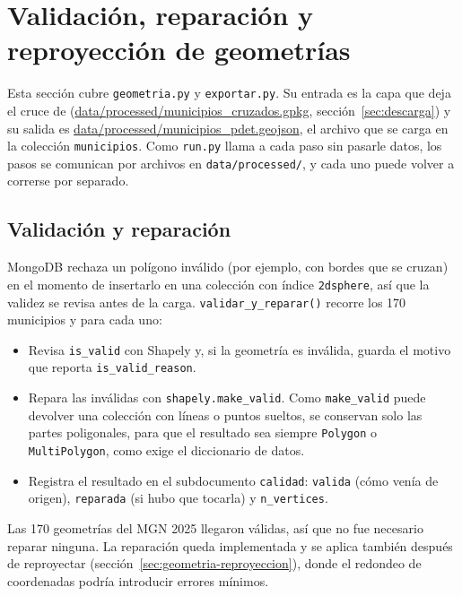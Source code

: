 \documentclass[11pt,a4paper]{article}
\newcommand{\campo}[1]{\texttt{#1}}
\newcommand{\ruta}[1]{\begingroup\urlstyle{tt}\url{#1}\endgroup}
\begin{document}
\section{Validación, reparación y reproyección de geometrías}
\label{sec:geometria}

Esta sección cubre \campo{geometria.py} y \campo{exportar.py}. Su entrada es
la capa que deja el cruce de (\ruta{data/processed/municipios_cruzados.gpkg},
sección~\ref{sec:descarga}) y su salida es
\ruta{data/processed/municipios_pdet.geojson}, el archivo que se carga en
la colección \campo{municipios}. Como \campo{run.py} llama a cada paso sin
pasarle datos, los pasos se comunican por archivos en
\campo{data/processed/}, y cada uno puede volver a correrse por separado.

\subsection{Validación y reparación}
\label{sec:geometria-validacion}

MongoDB rechaza un polígono inválido (por ejemplo, con bordes que se
cruzan) en el momento de insertarlo en una colección con índice
\campo{2dsphere}, así que la validez se revisa antes de la carga.
\campo{validar\_y\_reparar()} recorre los 170 municipios y para cada uno:

\begin{itemize}
  \item Revisa \campo{is\_valid} con Shapely y, si la geometría es inválida,
        guarda el motivo que reporta \campo{is\_valid\_reason}.
  \item Repara las inválidas con \campo{shapely.make\_valid}. Como
        \campo{make\_valid} puede devolver una colección con líneas o puntos
        sueltos, se conservan solo las partes poligonales, para que el
        resultado sea siempre \campo{Polygon} o \campo{MultiPolygon}, como
        exige el diccionario de datos.
  \item Registra el resultado en el subdocumento \campo{calidad}:
        \campo{valida} (cómo venía de origen), \campo{reparada} (si hubo que
        tocarla) y \campo{n\_vertices}.
\end{itemize}

Las 170 geometrías del MGN 2025 llegaron válidas, así que no fue necesario
reparar ninguna. La reparación queda implementada y se aplica también
después de reproyectar (sección~\ref{sec:geometria-reproyeccion}), donde el
redondeo de coordenadas podría introducir errores mínimos.
\end{document}
